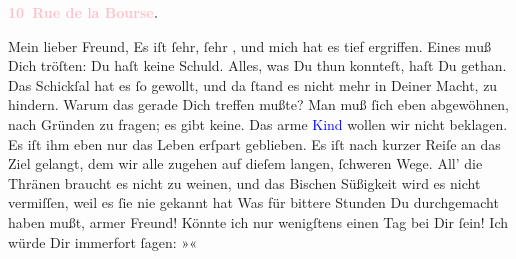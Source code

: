            \pstart
           \begin{otherlanguage}{french}\textcolor{gray}{\textbf{\textbf{\textcolor{pink}{10 Rue de la Bourse}{}\ledrightnote{\textcolor{pink}{rue de la Bourse}}.}}}\end{otherlanguage}\pend
           \pstart\center{}Mein lieber Freund,\pend\pstart
           Es iſt ſehr, ſehr \label{K_L02826-1v}\label{K_L02826-1h}, und
               mich hat es tief ergriffen. Eines muß Dich tröſten: Du haſt keine Schuld. Alles, was
               Du thun konnteſt, haſt Du gethan. Das Schickſal hat es ſo gewollt, und  da ſtand es nicht mehr in Deiner Macht, zu hindern. Warum das gerade Dich
               treffen mußte? Man muß ſich eben abgewöhnen, nach Gründen zu fragen; es gibt
               keine.\pend
           \pstart
           Das arme \textcolor{blue}{Kind}{} wollen wir
               nicht beklagen. Es iſt ihm eben nur das Leben erſpart geblieben. Es iſt nach kurzer
                  {\pb}Reiſe an das Ziel gelangt, dem wir alle zugehen
               auf dieſem langen, ſchweren Wege. All’ die Thränen braucht es nicht zu weinen, und
               das Bischen Süßigkeit wird es nicht vermiſſen, weil es ſie nie gekannt hat{\dotssix}\pend
           \pstart
           Was für bittere Stunden Du durchgemacht haben mußt, armer Freund! \strikeout{\textcolor{gray}{×}\-\textcolor{gray}{×}\-\textcolor{gray}{×}\-\textcolor{gray}{×}\-\textcolor{gray}{×}{ }\textcolor{gray}{×}\-\textcolor{gray}{×}\-\textcolor{gray}{×}\-\textcolor{gray}{×}\-\textcolor{gray}{×}} Könnte ich nur wenigſtens einen Tag bei Dir ſein! Ich würde Dir immerfort
               ſagen: »\label{K_L02826-3v}\label{K_L02826-3h}«\pend
